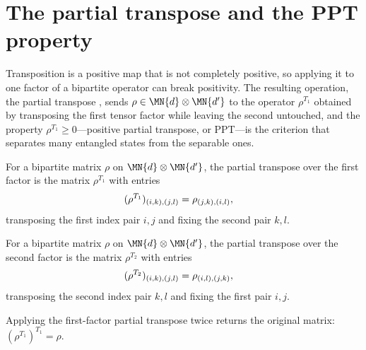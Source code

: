 \section{The partial transpose and the PPT property}

Transposition is a positive map that is not completely positive, so applying it
to one factor of a bipartite operator can break positivity. The resulting
operation, the partial transpose
\cite[Equation~(3.16)]{Wolf2012Quantum}, sends $\rho\in\MN{d}\otimes\MN{d'}$ to
the operator $\rho^{T_1}$ obtained by transposing the first tensor factor while
leaving the second untouched, and the property $\rho^{T_1}\ge 0$---positive
partial transpose, or PPT---is the criterion
\cite[Equation~(3.17)]{Wolf2012Quantum} that separates many entangled states
from the separable ones.

\begin{definition}
    \label{def:partial_transpose_left}
    \leanok
    For a bipartite matrix $\rho$ on $\MN{d}\otimes\MN{d'}$, the partial transpose
    over the first factor is the matrix $\rho^{T_1}$ with entries
    \begin{align}
        (\rho^{T_1})_{(i,k),(j,l)}
        &=\rho_{(j,k),(i,l)},
        \notag
    \end{align}
    transposing the first index pair $i,j$ and fixing the second pair $k,l$.
\end{definition}

\begin{definition}
    \label{def:partial_transpose_right}
    \leanok
    For a bipartite matrix $\rho$ on $\MN{d}\otimes\MN{d'}$, the partial transpose
    over the second factor is the matrix $\rho^{T_2}$ with entries
    \begin{align}
        (\rho^{T_2})_{(i,k),(j,l)}
        &=\rho_{(i,l),(j,k)},
        \notag
    \end{align}
    transposing the second index pair $k,l$ and fixing the first pair $i,j$.
\end{definition}

\begin{theorem}
    \label{thm:partial_transpose_left_involution}
    \leanok
    Applying the first-factor partial transpose twice returns the original matrix:
    $(\rho^{T_1})^{T_1}=\rho$.
\end{theorem}

